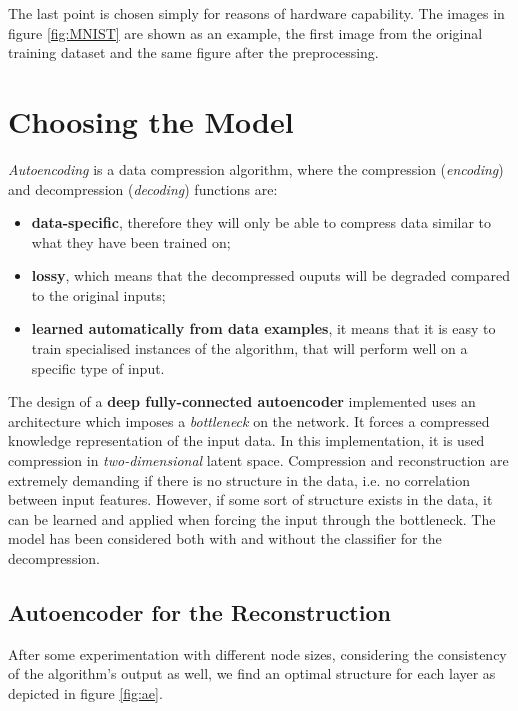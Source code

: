 \documentclass{article}
\begin{document}
The last point is chosen simply for reasons of hardware capability.
The images in figure \ref{fig:MNIST} are shown as an example, the first image from the original training dataset
and the same figure after the preprocessing.



\section{Choosing the Model}
\textit{Autoencoding} is a data compression algorithm, where the compression (\textit{encoding}) and decompression (\textit{decoding}) functions are:
\begin{itemize}
  \item \textbf{data-specific}, therefore they will only be able to compress data similar to what they have been trained on;
  \item \textbf{lossy}, which means that the decompressed ouputs will be degraded compared to the original inputs;
  \item \textbf{learned automatically from data examples}, it means that it is easy to train specialised instances of the algorithm, 
          that will perform well on a specific type of input.
\end{itemize}

\par The design of a \textbf{deep fully-connected autoencoder} implemented uses an architecture which imposes a \textit{bottleneck} on the network. 
It forces a compressed knowledge representation of the input data.
In this implementation, it is used compression in \textit{two-dimensional} latent space. 
Compression and reconstruction are extremely demanding if there is no structure in the data, 
i.e. no correlation between input features. 
However, if some sort of structure exists in the data, it can be learned and applied when forcing the input through the bottleneck.
The model has been considered both with and without the classifier for the decompression.

\subsection{Autoencoder for the Reconstruction}
After some experimentation with different node sizes, considering the consistency of 
the algorithm's output as well, we find an optimal structure for each layer as depicted in figure \ref{fig:ae}. 
\end{document}
